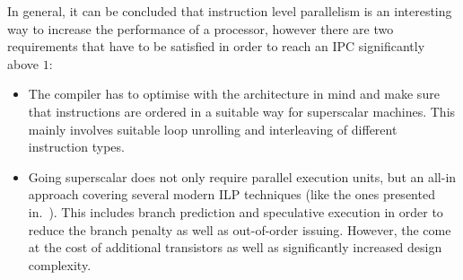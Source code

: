 \documentclass[conference]{IEEEtran}
\begin{document}
In general, it can be concluded that instruction level parallelism is an interesting way to increase the performance of a processor, however there are two requirements that have to be satisfied in order to reach an IPC significantly above $1$:

\begin{itemize}
	\item The compiler has to optimise with the architecture in mind and make sure that instructions are ordered in a suitable way for superscalar machines. This mainly involves suitable loop unrolling and interleaving of different instruction types.
	\item Going superscalar does not only require parallel execution units, but an all-in approach covering several modern ILP techniques (like the ones presented in.~\cite{HP}). This includes branch prediction and speculative execution in order to reduce the branch penalty as well as out-of-order issuing. However, the come at the cost of additional transistors as well as significantly increased design complexity.
\end{itemize}


\printbibliography
\end{document}
